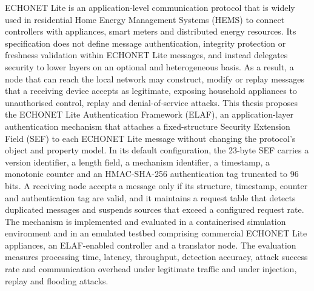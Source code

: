 \begin{EnAbstract}
ECHONET Lite is an application-level communication protocol that is widely used in residential Home Energy Management Systems (HEMS) to connect controllers with appliances, smart meters and distributed energy resources. Its specification does not define message authentication, integrity protection or freshness validation within ECHONET Lite messages, and instead delegates security to lower layers on an optional and heterogeneous basis. As a result, a node that can reach the local network may construct, modify or replay messages that a receiving device accepts as legitimate, exposing household appliances to unauthorised control, replay and denial-of-service attacks. This thesis proposes the ECHONET Lite Authentication Framework (ELAF), an application-layer authentication mechanism that attaches a fixed-structure Security Extension Field (SEF) to each ECHONET Lite message without changing the protocol's object and property model. In its default configuration, the 23-byte SEF carries a version identifier, a length field, a mechanism identifier, a timestamp, a monotonic counter and an HMAC-SHA-256 authentication tag truncated to 96 bits. A receiving node accepts a message only if its structure, timestamp, counter and authentication tag are valid, and it maintains a request table that detects duplicated messages and suspends sources that exceed a configured request rate. The mechanism is implemented and evaluated in a containerised simulation environment and in an emulated testbed comprising commercial ECHONET Lite appliances, an ELAF-enabled controller and a translator node. The evaluation measures processing time, latency, throughput, detection accuracy, attack success rate and communication overhead under legitimate traffic and under injection, replay and flooding attacks.
\end{EnAbstract}
